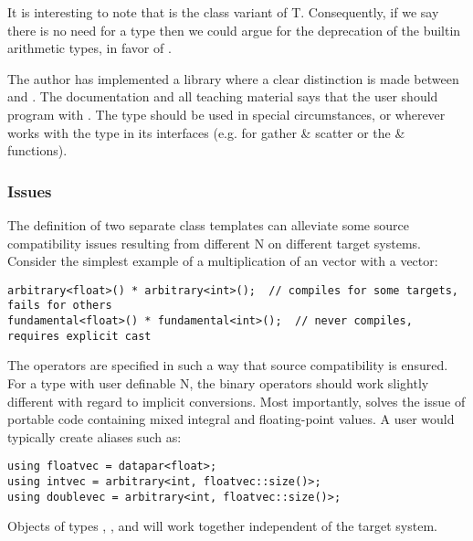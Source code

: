 It is interesting to note that  is the class variant of \type T.
Consequently, if we say there is no need for a  type then we could argue for the deprecation of the builtin arithmetic types, in favor of . 

The author has implemented a library where a clear distinction is made between  and .
The documentation and all teaching material says that the user should program with .
The  type should be used in special circumstances, or wherever  works with the  type in its interfaces (e.g. for gather \& scatter or the  \&  functions).

\subsubsection{Issues}
The definition of two separate class templates can alleviate some source compatibility issues resulting from different \code N on different target systems.
Consider the simplest example of a multiplication of an \intt vector with a \float vector:
\smallskip\begin{lstlisting}[style=Vc]
arbitrary<float>() * arbitrary<int>();  // compiles for some targets, fails for others
fundamental<float>() * fundamental<int>();  // never compiles, requires explicit cast
\end{lstlisting}
The \datapar[<T>] operators are specified in such a way that source compatibility is ensured.
For a type with user definable \code N, the binary operators should work slightly different with regard to implicit conversions.
Most importantly,  solves the issue of portable code containing mixed integral and floating-point values.
A user would typically create aliases such as:
\smallskip\begin{lstlisting}[style=Vc]
using floatvec = datapar<float>;
using intvec = arbitrary<int, floatvec::size()>;
using doublevec = arbitrary<int, floatvec::size()>;
\end{lstlisting}
Objects of types , , and  will work together independent of the target system.

